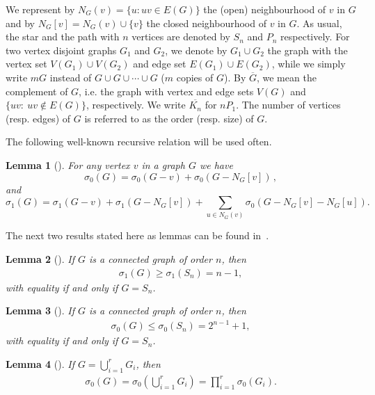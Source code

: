 \documentclass[a4paper,12pt]{amsart}
\newtheorem{lem}{Lemma}
\begin{document}
We represent by $N_G(v)=\{u: uv\in E(G)\}$ the (open) neighbourhood of $v$ in $G$ and by $N_G[v]=N_G(v)\cup\{v\}$ the closed neighbourhood of $v$ in $G$. As usual, the star and the path with $n$ vertices are denoted by $S_n$ and $P_n$ respectively. For two vertex disjoint graphs $G_1$ and $G_2$, we denote by $G_1 \cup G_2$ the graph with the vertex set $V(G_1) \cup V(G_2)$ and edge set $E(G_1) \cup E(G_2)$, while we simply write $m G$ instead of $G \cup G \cup \cdots \cup G$ ($m$ copies of $G$). By $\overline{G}$, we mean the complement of $G$, i.e. the graph with vertex and edge sets $V(G)$ and $\{uv:~ uv\notin E(G)\}$, respectively. We write $\overline{K_n}$ for $nP_1$. The number of vertices (resp. edges) of $G$ is referred to as the order (resp. size) of $G$.



\medskip

The following well-known recursive relation will be used often.
\begin{lem}[\cite{andriantiana2024number, merrifield1981enumeration}]
\label{Lem:Rec}
For any vertex $v$ in a graph $G$ we have
$$
\sigma_0(G)= \sigma_0(G-v)+\sigma_0(G-N_G[v])\,,$$
and 
$$
\sigma_1(G)= \sigma_1(G-v)+\sigma_1(G-N_G[v])+\sum_{u\in N_G(v)} \sigma_0(G-N_G[v]-N_G[u]).
$$
\end{lem}

\medskip
The next two results stated here as lemmas can be found in~\cite{andriantiana2024number,wagner2010maxima}.

\begin{lem}[\cite{andriantiana2024number}]
    \label{lem:lower-bound-for-sigma-1-of-connected-graphs}
     If $G$ is a connected graph of order $n$, then
     \begin{align*}
         \sigma_1(G) \ge \sigma_1(S_n) = n-1,
     \end{align*}
     with equality if and only if $G = S_n$.
\end{lem}

\begin{lem}[\cite{wagner2010maxima}]
    \label{lem:upper-bound-for-sigma-0-of-connected-graphs}
     If $G$ is a connected graph of order $n$, then
     \begin{align*}
         \sigma_0(G) \le \sigma_0(S_n) = 2^{n-1}+1,
     \end{align*}
     with equality if and only if $G = S_n$.
\end{lem}

\begin{lem}[\cite{wagner2010maxima}]
     \label{lem:sigma_0-and-Z_0}
     If $G=\displaystyle \bigcup\limits_{i=1}^r G_i$, then 
     \begin{align*}
         \sigma_0(G) = \sigma_0\left(\bigcup\limits_{i=1}^r G_i\right) = \prod\limits_{i=1}^r \sigma_0(G_i). %
     \end{align*}
 \end{lem}
\end{document}
